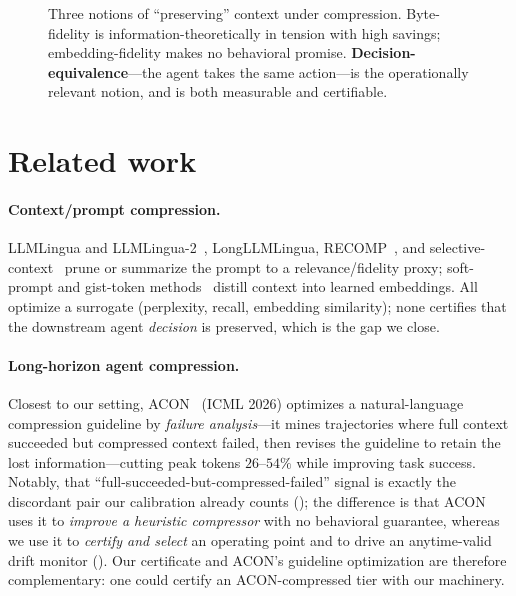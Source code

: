 \documentclass[11pt]{article}
\begin{document}
\begin{figure}[t]
\centering
{}
\caption{Three notions of ``preserving'' context under compression. Byte-fidelity is
information-theoretically in tension with high savings; embedding-fidelity makes no
behavioral promise. \textbf{Decision-equivalence}---the agent takes the same
action---is the operationally relevant notion, and is both measurable and
certifiable.}
\label{fig:concept}
\end{figure}

\section{Related work}
\paragraph{Context/prompt compression.} LLMLingua and LLMLingua-2~\cite{llmlingua},
LongLLMLingua, RECOMP~\cite{recomp}, and selective-context~\cite{selectivecontext} prune
or summarize the prompt to a relevance/fidelity proxy; soft-prompt and gist-token
methods~\cite{gist} distill context into learned embeddings. All optimize a surrogate
(perplexity, recall, embedding similarity); none certifies that the downstream agent
\emph{decision} is preserved, which is the gap we close.
\paragraph{Long-horizon agent compression.} Closest to our setting, ACON~\cite{acon}
(ICML 2026) optimizes a natural-language compression guideline by \emph{failure analysis}---it
mines trajectories where full context succeeded but compressed context failed, then revises the
guideline to retain the lost information---cutting peak tokens $26$--$54\%$ while improving task
success. Notably, that ``full-succeeded-but-compressed-failed'' signal is exactly the discordant
pair our calibration already counts (); the difference is that ACON uses it to
\emph{improve a heuristic compressor} with no behavioral guarantee, whereas we use it to
\emph{certify and select} an operating point and to drive an anytime-valid drift monitor
(). Our certificate and ACON's guideline optimization are therefore complementary:
one could certify an ACON-compressed tier with our machinery.
\end{document}
